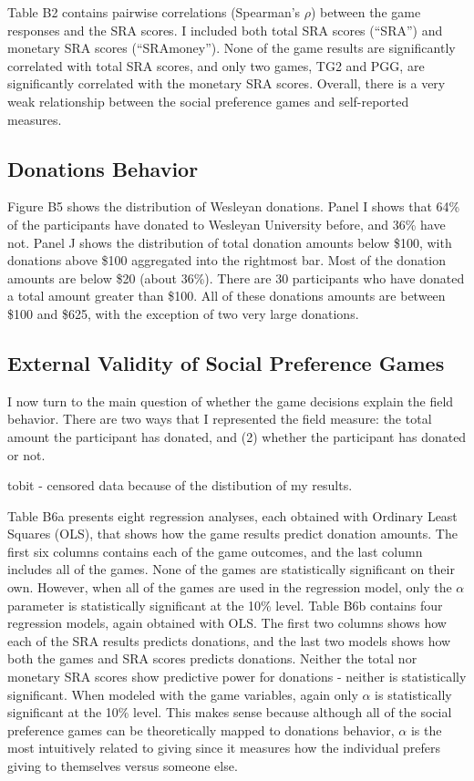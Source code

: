 \documentclass[12pt]{article}
\begin{document}
Table B2 contains pairwise correlations (Spearman\rq s \(\rho\)) between the game responses and the SRA scores. I included both total SRA scores (``SRA'') and monetary SRA scores (``SRAmoney''). None of the game results are significantly correlated with total SRA scores, and only two games, TG2 and PGG, are significantly correlated with the monetary SRA scores. Overall, there is a very weak relationship between the social preference games and self-reported measures. 

\subsection{Donations Behavior}

Figure B5 shows the distribution of Wesleyan donations. Panel I shows that 64\% of the participants have donated to Wesleyan University before, and 36\% have not. Panel J shows the distribution of total donation amounts below \$100, with donations above \$100 aggregated into the rightmost bar. Most of the donation amounts are below \$20 (about 36\%). There are 30 participants who have donated a total amount greater than \$100. All of these donations amounts are between \$100 and \$625, with the exception of two very large donations.

\subsection{External Validity of Social Preference Games}
I now turn to the main question of whether the game decisions explain the field behavior. There are two ways that I represented the field measure: the total amount the participant has donated, and (2) whether the participant has donated or not. 



tobit - censored data because of the distibution of my results.




Table B6a presents eight regression analyses, each obtained with Ordinary Least Squares (OLS), that shows how the game results predict donation amounts. The first six columns contains each of the game outcomes, and the last column includes all of the games. None of the games are statistically significant on their own. However, when all of the games are used in the regression model, only the \(\alpha\) parameter is statistically significant at the 10\% level. Table B6b contains four regression models, again obtained with OLS. The first two columns shows how each of the SRA results predicts donations, and the last two models shows how both the games and SRA scores predicts donations. Neither the total nor monetary SRA scores show predictive power for donations - neither is statistically significant. When modeled with the game variables, again only \(\alpha\) is statistically significant at the 10\% level. This makes sense because although all of the social preference games can be theoretically mapped to donations behavior, \(\alpha\) is the most intuitively related to giving since it measures how the individual prefers giving to themselves versus someone else. 
\end{document}
